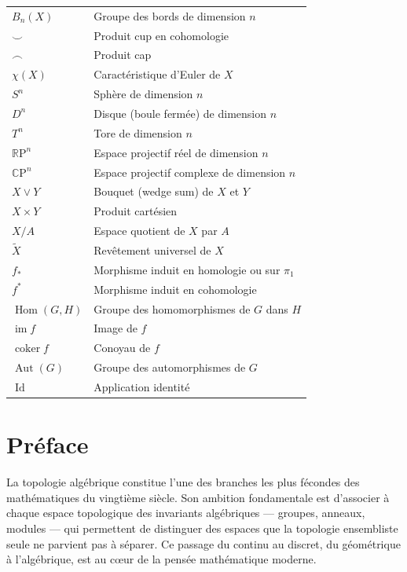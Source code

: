\documentclass[12pt,a4paper,openany]{book}
\theoremstyle{definition}
\theoremstyle{plain}
\theoremstyle{remark}
\newcommand{\RP}{\mathbb{R}\mathrm{P}}
\newcommand{\CP}{\mathbb{C}\mathrm{P}}
\DeclareMathOperator{\Hom}{Hom}
\DeclareMathOperator{\im}{im}
\DeclareMathOperator{\coker}{coker}
\DeclareMathOperator{\Aut}{Aut}
\DeclareMathOperator{\Id}{Id}
\begin{document}
\begin{longtable}{>{\raggedright}p{4.5cm} p{9cm}}
$B_n(X)$ & Groupe des bords de dimension $n$ \\
$\smile$ & Produit cup\index{produit cup} en cohomologie \\
$\frown$ & Produit cap\index{produit cap} \\
$\chi(X)$ & Caractéristique d'Euler\index{caractéristique d'Euler} de $X$ \\
$S^n$ & Sphère\index{sphère} de dimension $n$ \\
$D^n$ & Disque (boule fermée) de dimension $n$ \\
$T^n$ & Tore\index{tore} de dimension $n$ \\
$\RP^n$ & Espace projectif réel\index{espace projectif réel} de dimension $n$ \\
$\CP^n$ & Espace projectif complexe\index{espace projectif complexe} de dimension $n$ \\
$X \vee Y$ & Bouquet\index{bouquet} (wedge sum) de $X$ et $Y$ \\
$X \times Y$ & Produit cartésien \\
$X / A$ & Espace quotient\index{espace quotient} de $X$ par $A$ \\
$\widetilde{X}$ & Revêtement universel\index{revêtement universel} de $X$ \\
$f_*$ & Morphisme induit en homologie ou sur $\pi_1$ \\
$f^*$ & Morphisme induit en cohomologie \\
$\Hom(G, H)$ & Groupe des homomorphismes de $G$ dans $H$ \\
$\im f$ & Image de $f$ \\
$\coker f$ & Conoyau de $f$ \\
$\Aut(G)$ & Groupe des automorphismes de $G$ \\
$\Id$ & Application identité \\
\end{longtable}

\chapter*{Préface}

La topologie algébrique constitue l'une des branches les plus fécondes des
mathématiques du vingtième siècle. Son ambition fondamentale est d'associer à
chaque espace topologique des invariants algébriques --- groupes, anneaux,
modules --- qui permettent de distinguer des espaces que la topologie ensembliste
seule ne parvient pas à séparer. Ce passage du continu au discret, du
géométrique à l'algébrique, est au c\oe ur de la pensée mathématique moderne.
\end{document}
